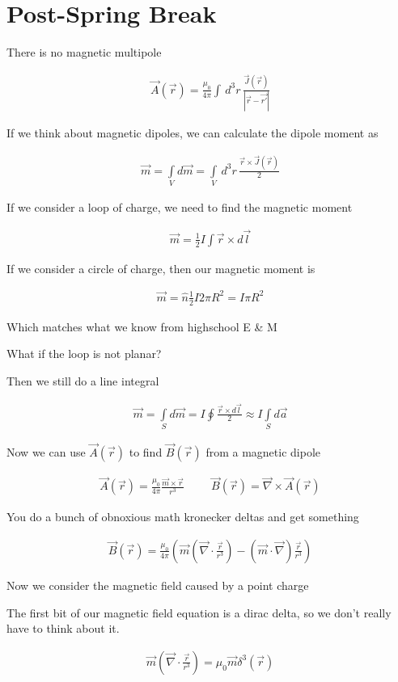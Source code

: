 \documentclass[fleqn]{report}
\newcommand{\hp}{\hspace{1cm}}
\newcommand{\equations} [1] {
\begin{gather*}
#1
\end{gather*}
}
\begin{document}
\section{Post-Spring Break}
There is no magnetic multipole 

\equations{
    \vec A(\vec r) 
    =
    \frac{\mu_0}{4 \pi}
    \int \, d^3 r \, 
    \frac{\vec J(\vec r)}{|\vec r - \vec{r'}|}
}

If we think about magnetic dipoles, we can calculate the dipole moment 
as 

\equations{
    \vec m 
    =
    \int\limits_V d \vec m 
    =
    \int\limits_V \, d^3 r \, 
    \frac{\vec r \times \vec J(\vec r)}{2}
}

If we consider a loop of charge, we need to find the magnetic moment 
\equations{
    \vec m 
    =
    \frac{1}{2} I 
    \int \vec r \times d \vec l
}

If we consider a circle of charge, then our magnetic moment is 
\equations{
    \vec m 
    =
    \hat n 
    \frac{1}{2} I 2 \pi R^2 
    =
    I \pi R^2 
}

Which matches what we know from highschool E \& M 

What if the loop is not planar? 

Then we still do a line integral 

\equations{
    \vec m = \int\limits_S d \vec m 
    =
    I \oint \frac{\vec r \times d \vec l}{2}
    \approx 
    I \int\limits_S d \vec a
}

Now we can use $\vec A(\vec r)$ to find $\vec B(\vec r)$ from a 
magnetic dipole 

\equations{
    \vec A(\vec r) = \frac{\mu_0}{4 \pi} \frac{\vec m \times \vec r}{r^3}
    \hp 
    \vec B(\vec r) = \vec \nabla \times \vec A(\vec r)
}

You do a bunch of obnoxious math kronecker deltas and get something 

\equations{
    \vec B(\vec r)
    =
    \frac{\mu_0}{4 \pi}
    \left(
        \vec m(\vec \nabla \cdot \frac{\vec r}{r^3})
        -
        (\vec m \cdot \vec \nabla) \frac{\vec r}{r^3}
    \right)
}

Now we consider the magnetic field caused by a point charge 

The first bit of our magnetic field equation is a dirac delta, so we 
don't really have to think about it.

\equations{
    \vec m(\vec \nabla \cdot \frac{\vec r}{r^3})
    =
    \mu_0 \vec m \delta^3(\vec r)
}
\end{document}
